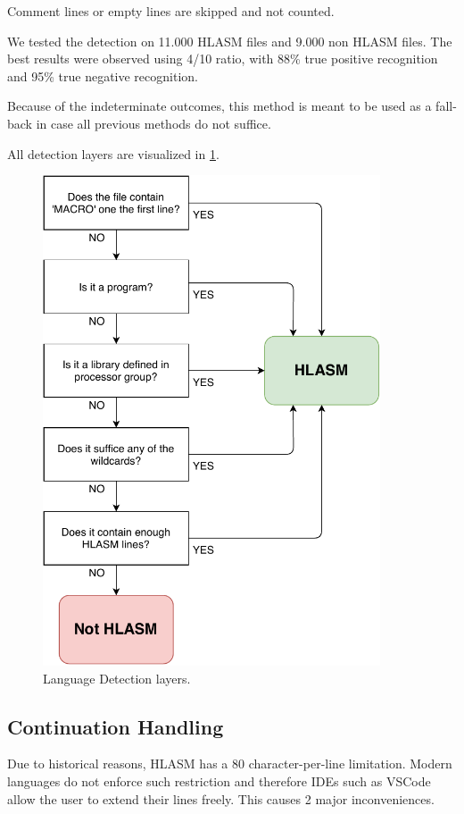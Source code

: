Comment lines or empty lines are skipped and not counted. 

We tested the detection on 11.000 HLASM files and 9.000 non HLASM files. The best results were observed using 4/10 ratio, with 88\% true positive recognition and 95\% true negative recognition. 

Because of the indeterminate outcomes, this method is meant to be used as a fall-back in case all previous methods do not suffice.

All detection layers are visualized in \cref{fig08:lang}.

\begin{figure}
	\centering
	\includegraphics[width=10cm]{img/lang_detection}
	\caption{Language Detection layers.}
	
	\label{fig08:lang}
\end{figure}

\subsection{Continuation Handling}

Due to historical reasons, HLASM has a 80 character-per-line limitation. Modern languages do not enforce such restriction and therefore IDEs such as VSCode allow the user to extend their lines freely. This causes 2 major inconveniences.

